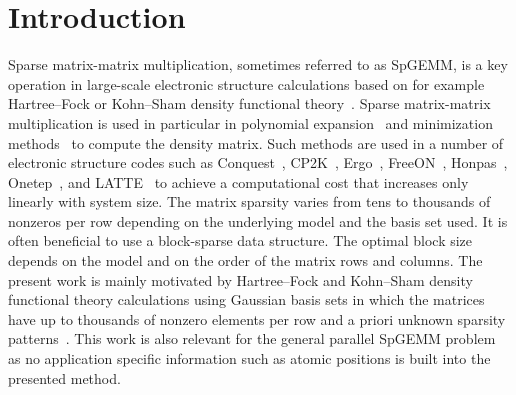\documentclass{elsarticle}
\begin{document}
\section{Introduction}
Sparse matrix-matrix multiplication, sometimes referred to as SpGEMM,
is a key operation in large-scale electronic structure calculations
based on for example Hartree--Fock or Kohn--Sham density functional
theory~\cite{DBowler12}. Sparse matrix-matrix multiplication is used
in particular in polynomial expansion~\cite{pur-pm} and minimization
methods~\cite{dmm-lnv} to compute the density matrix.  Such methods
are used in a number of electronic structure codes such as {\sc
  Conquest}~\cite{conquestGillan200714}, {\sc
  CP2K}~\cite{cp2k-linearscaling}, {\sc Ergo}~\cite{linmemDFT}, {\sc
  FreeON}~\cite{FreeON}, {\sc Honpas}~\cite{honpas}, {\sc
  Onetep}~\cite{onetep}, and {\sc LATTE}~\cite{LATTE-jcp-2012} to
achieve a computational cost that increases only linearly with system
size.  The matrix sparsity varies from tens
to thousands of nonzeros per row depending on the underlying model and
the basis set used. It is often beneficial to use a block-sparse data
structure. The optimal block size depends on the model and on the
order of the matrix rows and columns.  The present work is mainly
motivated by Hartree--Fock and Kohn--Sham density functional theory
calculations using Gaussian basis sets in which the matrices have up
to thousands of nonzero elements per row and a priori unknown sparsity
patterns~\cite{sparsity-JCC:JCC21723, linmemDFT}.  This work is also
relevant for the general parallel SpGEMM problem as no application
specific information such as atomic positions is built into the
presented method.
\end{document}
